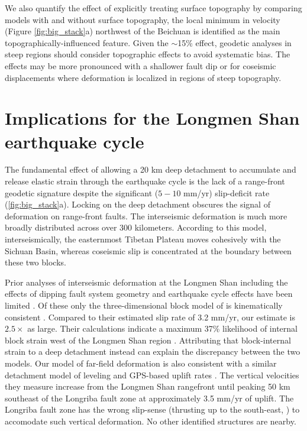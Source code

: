 \documentclass[12pt]{article}
\begin{document}
We also quantify the effect of explicitly treating surface topography by comparing models with and without surface topography, the local minimum in velocity (Figure \ref{fig:big_stack}a) northwest of the Beichuan is identified as the main topographically-influenced feature. Given the ${\sim}$15\% effect, geodetic analyses in steep regions should consider topographic effects to avoid systematic bias. The effects may be more pronounced with a shallower fault dip or for coseismic displacements where deformation is localized in regions of steep topography.

\section{Implications for the Longmen Shan earthquake cycle}
The fundamental effect of allowing a 20 km deep detachment to accumulate and release elastic strain through the earthquake cycle is the lack of a range-front geodetic signature despite the significant ($5-10$ mm/yr) slip-deficit rate (\ref{fig:big_stack}a). Locking on the deep detachment obscures the signal of deformation on range-front faults. The interseismic deformation is much more broadly distributed across over 300 kilometers. According to this model, interseismically, the easternmost Tibetan Plateau moves cohesively with the Sichuan Basin, whereas coseismic slip is concentrated at the boundary between these two blocks.

Prior analyses of interseismic deformation at the Longmen Shan including the effects of dipping fault system geometry and earthquake cycle effects have been limited \citep{Loveless2011, Qi2011, Hao2014}. Of these only the three-dimensional block model of \citet{Loveless2011} is kinematically consistent \citep{minster87,mccaffrey02,Meade2005}. Compared to their estimated slip rate of 3.2 mm/yr, our estimate is $2.5 \times$ as large.  Their calculations indicate a maximum 37\% likelihood of internal block strain west of the Longmen Shan region \citep{Loveless2011}. Attributing that block-internal strain to a deep detachment instead can explain the discrepancy between the two models. Our model of far-field deformation is also consistent with a similar detachment model of leveling and GPS-based uplift rates \citep{Hao2014}. The vertical velocities they measure increase from the Longmen Shan rangefront until peaking 50 km southeast of the Longriba fault zone at approximately 3.5 mm/yr of uplift. The Longriba fault zone has the wrong slip-sense (thrusting up to the south-east, \citep{Ren2013}) to accomodate such vertical deformation. No other identified structures are nearby. 
\end{document}
